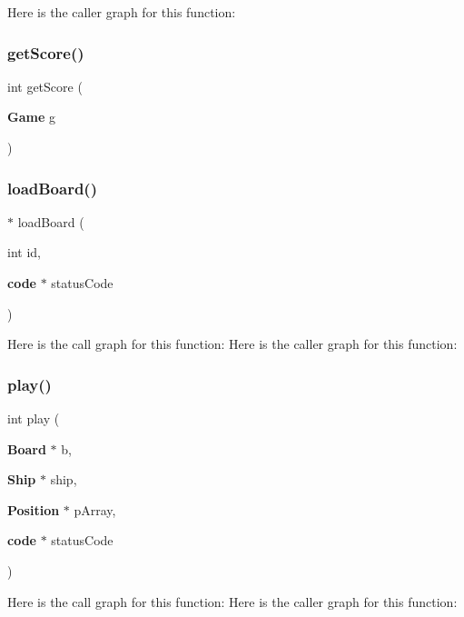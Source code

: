 Here is the caller graph for this function\+:
\label{funciones_8c_a150dfb9de666aa3178ab5efd7422fe27} 
\subsubsection{get\+Score()}
{\footnotesize\ttfamily int get\+Score (\begin{DoxyParamCaption}\item[{{\bf Game}}]{g }\end{DoxyParamCaption})}

\label{funciones_8c_a0ff3822d75e160b1f73eb734a175f99a} 
\subsubsection{load\+Board()}
{\footnotesize{}$\ast$ load\+Board (\begin{DoxyParamCaption}\item[{int}]{id,  }\item[{{\bf code} $\ast$}]{status\+Code }\end{DoxyParamCaption})}

Here is the call graph for this function\+:
Here is the caller graph for this function\+:
\label{funciones_8c_a6400036d175afce2372bc6bdd454b7f9} 
\subsubsection{play()}
{\footnotesize\ttfamily int play (\begin{DoxyParamCaption}\item[{{\bf Board} $\ast$}]{b,  }\item[{{\bf Ship} $\ast$}]{ship,  }\item[{{\bf Position} $\ast$}]{p\+Array,  }\item[{{\bf code} $\ast$}]{status\+Code }\end{DoxyParamCaption})}

Here is the call graph for this function\+:
Here is the caller graph for this function\+:
\label{funciones_8c_acf7fb2d72d56ba30e1956c8e05247ce7} 
